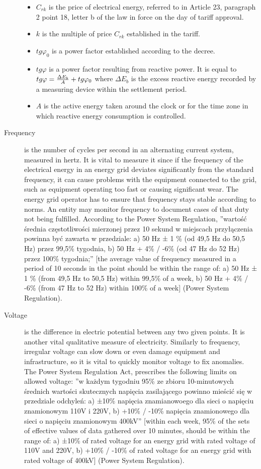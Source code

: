 \begin{description}
\begin{itemize}
  \item $C_{rk}$ is the price of electrical energy, referred to in Article 23, paragraph 2 point 18, letter b of the law in force on the day of tariff approval.
  \item $k$ is the multiple of price $C_{rk}$ established in the tariff.
  \item $tg \varphi_{0}$ is a power factor established according to the decree.
  \item $tg \varphi$ is a power factor resulting from reactive power. It is equal to ${tg \varphi} = {{{\Delta E_{b}} \over A} + tg \varphi_{0}}$ where $\Delta E_{b}$ is the excess reactive energy recorded by a measuring device within the settlement period.
  \item $A$ is the active energy taken around the clock or for the time zone in which reactive energy consumption is controlled.
\end{itemize}
  \item[Frequency] is the number of cycles per second in an alternating current system, measured in hertz. It is vital to measure it since if the frequency of the electrical energy in an energy grid deviates significantly from the standard frequency, it can cause problems with the equipment connected to the grid, such as equipment operating too fast or causing significant wear. The energy grid operator has to ensure that frequency stays stable according to norms. An entity may monitor frequency to document cases of that duty not being fulfilled. According to the Power System Regulation, ''wartość średnia częstotliwości mierzonej przez 10 sekund w miejscach przyłączenia powinna być zawarta w przedziale: a) 50 Hz ± 1 \% (od 49,5 Hz do 50,5 Hz) przez 99,5\% tygodnia, b) 50 Hz + 4\% / -6\% (od 47 Hz do 52 Hz) przez 100\% tygodnia;'' [the average value of frequency measured in a period of 10 seconds in the point should be within the range of: a) 50 Hz ± 1 \% (from 49,5 Hz to 50,5 Hz) within 99,5\% of a week, b) 50 Hz + 4\% / -6\% (from 47 Hz to 52 Hz) within 100\% of a week] (Power System Regulation)\citep{psr}.
  \item[Voltage] is the difference in electric potential between any two given points. It is another vital qualitative measure of electricity. Similarly to frequency, irregular voltage can slow down or even damage equipment and infrastructure, so it is vital to quickly monitor voltage to fix anomalies. The Power System Regulation Act, prescribes the following limits on allowed voltage: ''w każdym tygodniu 95\% ze zbioru 10-minutowych średnich wartości skutecznych napięcia zasilającego powinno mieścić się w przedziale odchyleń: a) ±10\% napięcia znamianowoego dla sieci o napięciu znamionowym 110V i 220V, b) +10\% / -10\% napięcia znamionowego dla sieci o napięciu znamionowym 400kV'' [within each week, 95\% of the sets of effective values of data gathered over 10 minutes, should be within the range of: a) ±10\% of rated voltage for an energy grid with rated voltage of 110V and 220V, b) +10\% / -10\% of rated voltage for an energy grid with rated voltage of 400kV] (Power System Regulation)\citep{psr}.
\end{description}

